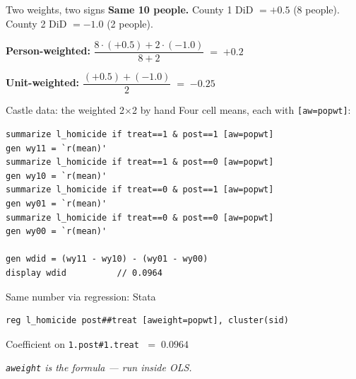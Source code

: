 \documentclass[aspectratio=169,11pt]{beamer}
\begin{document}
\begin{frame}{Two weights, two signs}
\vspace{0.4em}
\textbf{Same 10 people.} \;County 1 DiD $= +0.5$ (8 people). \;County 2 DiD $= -1.0$ (2 people).

\vspace{1em}
\begin{center}
\textbf{Person-weighted:} \;\;
$\dfrac{8 \cdot (+0.5) + 2 \cdot (-1.0)}{8 + 2} \;=\; \mathbf{+0.2}$
\end{center}

\vspace{0.5em}
\begin{center}
\textbf{Unit-weighted:} \;\;
$\dfrac{(+0.5) + (-1.0)}{2} \;=\; \mathbf{-0.25}$
\end{center}

\vspace{1em}
\begin{center}
\end{center}
\end{frame}

\begin{frame}[fragile]{Castle data: the weighted 2$\times$2 by hand}
\footnotesize
Four cell means, each with \texttt{[aw=popwt]}:
\vspace{0.2em}
\begin{lstlisting}[language={[ANSI]C},basicstyle=\ttfamily\scriptsize]
summarize l_homicide if treat==1 & post==1 [aw=popwt]
gen wy11 = `r(mean)'
summarize l_homicide if treat==1 & post==0 [aw=popwt]
gen wy10 = `r(mean)'
summarize l_homicide if treat==0 & post==1 [aw=popwt]
gen wy01 = `r(mean)'
summarize l_homicide if treat==0 & post==0 [aw=popwt]
gen wy00 = `r(mean)'

gen wdid = (wy11 - wy10) - (wy01 - wy00)
display wdid          // 0.0964
\end{lstlisting}
\end{frame}

\begin{frame}[fragile]{Same number via regression: Stata}
\vspace{0.6em}
\begin{lstlisting}[language={[ANSI]C},basicstyle=\ttfamily\small]
reg l_homicide post##treat [aweight=popwt], cluster(sid)
\end{lstlisting}

\vspace{0.8em}
\begin{center}
Coefficient on \texttt{1.post\#1.treat} $\;=\; \mathbf{0.0964}$
\end{center}

\vspace{1em}
\begin{center}
\small\color{warmgray}\itshape \texttt{aweight} \textit{is} the formula --- run inside OLS.
\end{center}
\end{frame}
\end{document}
